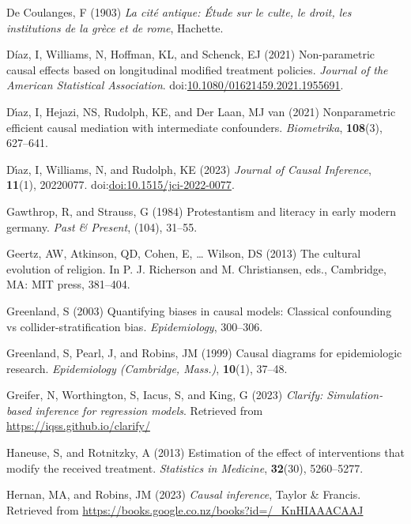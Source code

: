 \documentclass[
  single column]{article}
\newlength{\cslhangindent}
\newenvironment{CSLReferences}[2] %
 {\begin{list}{}{%
  \setlength{\itemindent}{0pt}
  \setlength{\leftmargin}{0pt}
  \setlength{\parsep}{0pt}
  \ifodd #1
   \setlength{\leftmargin}{\cslhangindent}
   \setlength{\itemindent}{-1\cslhangindent}
  \fi
  \setlength{\itemsep}{#2\baselineskip}}}
 {\end{list}}
\begin{document}
\begin{CSLReferences}{1}{0}
De Coulanges, F (1903) \emph{La cité antique: Étude sur le culte, le
droit, les institutions de la grèce et de rome}, Hachette.

Díaz, I, Williams, N, Hoffman, KL, and Schenck, EJ (2021) Non-parametric
causal effects based on longitudinal modified treatment policies.
\emph{Journal of the American Statistical Association}.
doi:\href{https://doi.org/10.1080/01621459.2021.1955691}{10.1080/01621459.2021.1955691}.

Dı́az, I, Hejazi, NS, Rudolph, KE, and Der Laan, MJ van (2021)
Nonparametric efficient causal mediation with intermediate confounders.
\emph{Biometrika}, \textbf{108}(3), 627--641.

Dı́az, I, Williams, N, and Rudolph, KE (2023) \emph{Journal of Causal
Inference}, \textbf{11}(1), 20220077.
doi:\href{https://doi.org/doi:10.1515/jci-2022-0077}{doi:10.1515/jci-2022-0077}.

Gawthrop, R, and Strauss, G (1984) Protestantism and literacy in early
modern germany. \emph{Past \& Present}, (104), 31--55.

Geertz, AW, Atkinson, QD, Cohen, E, \ldots{} Wilson, DS (2013) The
cultural evolution of religion. In P. J. Richerson and M. Christiansen,
eds., Cambridge, MA: MIT press, 381--404.

Greenland, S (2003) Quantifying biases in causal models: Classical
confounding vs collider-stratification bias. \emph{Epidemiology},
300--306.

Greenland, S, Pearl, J, and Robins, JM (1999) Causal diagrams for
epidemiologic research. \emph{Epidemiology (Cambridge, Mass.)},
\textbf{10}(1), 37--48.

Greifer, N, Worthington, S, Iacus, S, and King, G (2023) \emph{Clarify:
Simulation-based inference for regression models}. Retrieved from
\url{https://iqss.github.io/clarify/}

Haneuse, S, and Rotnitzky, A (2013) Estimation of the effect of
interventions that modify the received treatment. \emph{Statistics in
Medicine}, \textbf{32}(30), 5260--5277.

Hernan, MA, and Robins, JM (2023) \emph{Causal inference}, Taylor \&
Francis. Retrieved from
\url{https://books.google.co.nz/books?id=/_KnHIAAACAAJ}


\end{CSLReferences}
\end{document}
